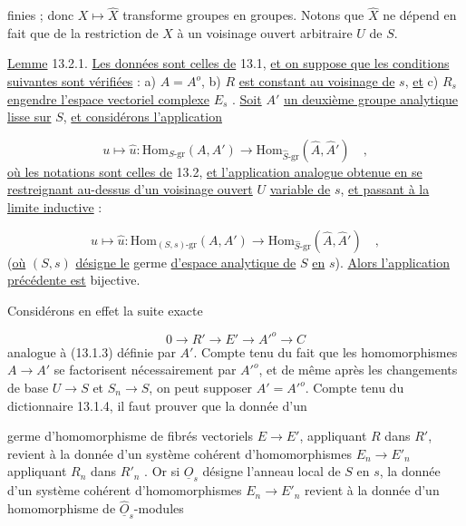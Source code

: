 finies ; donc $X \longmapsto \hat{X}$ transforme groupes en groupes. Notons que $\hat{X}$ ne dépend en fait que de la restriction de $X$ à un voisinage ouvert arbitraire $U$ de $S$.

\underline{Lemme} 13.2.1. \underline{Les données sont celles de} 13.1, \underline{et on suppose que les conditions suivantes sont vérifiées} : a) $A = A^{o}$,  b)  $R$ \underline{est constant au voisinage de} $s$, \underline{et} c) $R_s$ \underline{engendre l'espace vectoriel complexe} $E_s$ . \underline{Soit} $A'$ \underline{un deuxième groupe analytique lisse sur} $S$, \underline{et considérons l'application}

\begin{equation*}
u \longmapsto \hat{u} : \mathrm{Hom}_{S\text{-}\mathrm{gr}}(A,A') \longrightarrow \mathrm{Hom}_{\hat{S}\text{-}\mathrm{gr}}(\hat{A},\hat{A}') \quad ,
\end{equation*}
\underline{où les notations sont celles de} 13.2, \underline{et l'application analogue obtenue en se restreignant au-dessus d'un voisinage ouvert} $U$ \underline{variable de} $s$, \underline{et passant à la limite inductive} :

\begin{equation}\tag{13.2.1.1}
u \longmapsto \hat{u} : \mathrm{Hom}_{(S,s)\text{-}\mathrm{gr}}(A,A') \longrightarrow \mathrm{Hom}_{\hat{S}\text{-}\mathrm{gr}}(\hat{A},\hat{A}') \quad ,
\end{equation}
(\underline{où} $(S,s)$ \underline{désigne le} germe \underline{d'espace analytique de} $S$ \underline{en} $s$). \underline{Alors l'application précédente est} bijective.

Considérons en effet la suite exacte

\begin{equation*}
0 \longrightarrow R' \longrightarrow E' \longrightarrow {A'}^{o} \longrightarrow C
\end{equation*}
analogue à (13.1.3) définie par $A'$. Compte tenu du fait que les homomorphismes $A \longrightarrow A'$ se factorisent nécessairement par ${A'}^{o}$, et de même après les changements de base $U \longrightarrow S$ et $S_n \longrightarrow S$, on peut supposer $A' = {A'}^{o}$. Compte tenu du dictionnaire 13.1.4, il faut prouver que la donnée d'un



germe d'homomorphisme de fibrés vectoriels $E \longrightarrow E'$, appliquant $R$ dans $R'$, revient à la donnée d'un système cohérent d'homomorphismes $E_n \longrightarrow E'_n$ appliquant $R_n$ dans $R'_n$ . Or si $\underline{O}_s$ désigne l'anneau local de $S$ en $s$, la donnée d'un système cohérent d'homomorphismes $E_n \longrightarrow E'_n$ revient à la donnée d'un homomorphisme de $\hat{\underline{O}}_s$-modules

